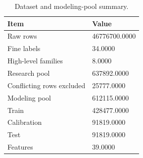 \begin{table}
\caption{Dataset and modeling-pool summary.}
\label{tab:table01_dataset_summary}
\begin{tabular}{ll}
\toprule
Item & Value \\
\midrule
Raw rows & 46776700.0000 \\
Fine labels & 34.0000 \\
High-level families & 8.0000 \\
Research pool & 637892.0000 \\
Conflicting rows excluded & 25777.0000 \\
Modeling pool & 612115.0000 \\
Train & 428477.0000 \\
Calibration & 91819.0000 \\
Test & 91819.0000 \\
Features & 39.0000 \\
\bottomrule
\end{tabular}
\end{table}
